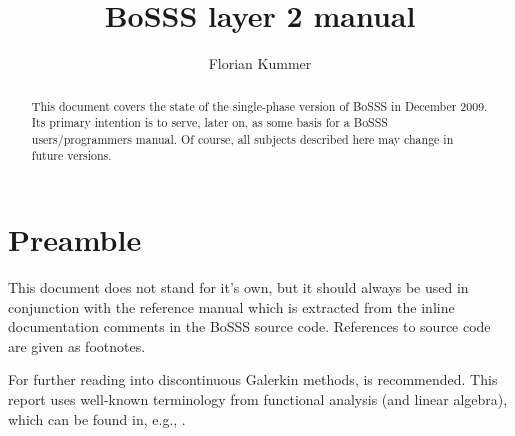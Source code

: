 \documentclass[11pt,twoside,a4paper]{fdyartcl}
\title{BoSSS layer 2 manual}
\author{Florian Kummer}
\newcommand{\clearemptydoublepage}%
{\newpage{\pagestyle{empty}\cleardoublepage}}
\begin{document}

\setcounter{page}{1}   %

\maketitle


\begin{abstract}
This document covers the state of the single-phase version of BoSSS in December 2009.
Its primary intention is to serve, later on, as some basis for a BoSSS users/programmers manual.
Of course, all subjects described here may change in future versions.
\end{abstract}


\section{Preamble}

This document does not stand for it's own, but it
should always be used in conjunction with the reference manual which is extracted from the
inline documentation comments in the BoSSS source code.
References to source code are given as footnotes.

For further reading into discontinuous Galerkin methods, \cite{HesthavenWarburton08}
is recommended. This report uses well-known terminology from functional
analysis (and linear algebra), which can be found in, e.g., \cite{Triebel1980}.











\clearemptydoublepage
\end{document}
